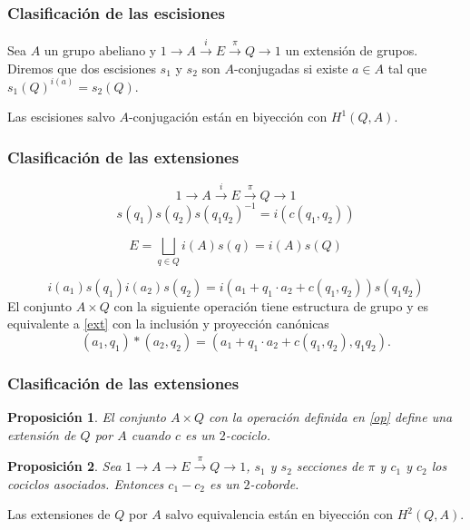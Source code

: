 \documentclass[
	11pt, %
]{beamer}
\newcommand{\extension}[5]{1\xrightarrow{} #3 \xrightarrow{#1} #4\xrightarrow{#2} #5 \xrightarrow{} 1}
\newtheorem{proposition}{Proposici\'on}
\begin{document}
\begin{frame}
	\frametitle{Clasificación de las escisiones}
	\begin{definition}
		Sea $A$ un grupo abeliano y $\extension i \pi A E Q$ un extensión de grupos. Diremos que dos escisiones $s_1$ y $s_2$ son $A$-conjugadas si existe $a\in A$ tal que $s_1(Q)^{i(a)} = s_2(Q)$.
	\end{definition}
	
	\begin{theorem}
		Las escisiones salvo $A$-conjugación están en biyección con $H^1(Q,A)$.
	\end{theorem}
\end{frame}

\begin{frame}
	\frametitle{Clasificación de las extensiones}
	
	\begin{equation}\label{ext}
		\extension i \pi A E Q
	\end{equation}
	\begin{equation*}
		s(q_1)s(q_2)s(q_1q_2)^{-1} = i(c(q_1,q_2))
	\end{equation*}
	
	$$	
		E = \bigsqcup_{q\in Q} i(A)s(q) = i(A)s(Q)
	$$
	
	$$
		i(a_1)s(q_1)i(a_2)s(q_2) = %
		i(a_1+q_1\cdot a_2 + c(q_1,q_2))s(q_1q_2)
	$$
	El conjunto $A\times Q$ con la siguiente operación tiene estructura de grupo y es equivalente a \eqref{ext} con la inclusión y proyección canónicas
	\begin{equation}\label{op}
		(a_1,q_1)*(a_2,q_2) = (a_1+q_1\cdot a_2 + c(q_1,q_2),q_1q_2). 
	\end{equation}
\end{frame}

\begin{frame}
	\frametitle{Clasificación de las extensiones}
	\begin{proposition}
		El conjunto $A\times Q$ con la operación definida en \eqref{op} define una extensión de $Q$ por $A$ cuando $c$ es un $2$-cociclo.
	\end{proposition}
	
	\begin{proposition}
		Sea $\extension {}{\pi} A E Q$, $s_1$ y $s_2$ secciones de $\pi$ y $c_1$ y $c_2$ los cociclos asociados. Entonces $c_1-c_2$ es un $2$-coborde. 
	\end{proposition}
	
	\begin{theorem}
		Las extensiones de $Q$ por $A$ salvo equivalencia están en biyección con $H^2(Q,A)$.
	\end{theorem}	
\end{frame}
\end{document}
